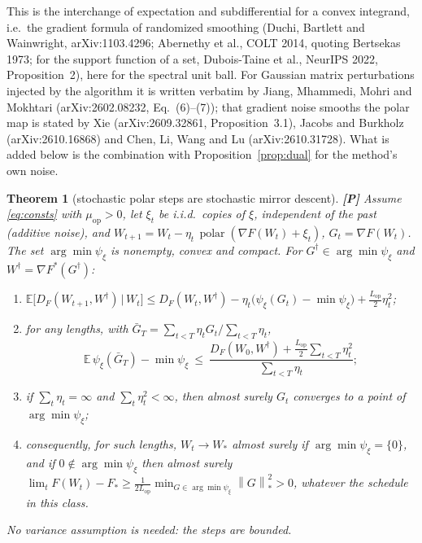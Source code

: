 \documentclass[11pt]{article}
\newtheorem{theorem}{Theorem}[section]
\theoremstyle{definition}
\theoremstyle{remark}
\newcommand{\E}{\mathbb{E}}
\newcommand{\nnuc}[1]{\left\|#1\right\|_{*}}
\newcommand{\polar}{\operatorname{polar}}
\newcommand{\Lop}{L_{\mathrm{op}}}
\newcommand{\muop}{\mu_{\mathrm{op}}}
\begin{document}
This is the interchange of expectation and subdifferential for a convex integrand, i.e.\ the gradient formula of
randomized smoothing (Duchi, Bartlett and Wainwright, arXiv:1103.4296; Abernethy et al., COLT 2014, quoting Bertsekas
1973; for the support function of a set, Dubois-Taine et al., NeurIPS 2022, Proposition~2), here for the spectral unit
ball. For Gaussian matrix perturbations injected by the algorithm it is written verbatim by Jiang, Mhammedi, Mohri and
Mokhtari (arXiv:2602.08232, Eq.~(6)--(7)); that gradient noise smooths the polar map is stated by Xie (arXiv:2609.32861,
Proposition~3.1), Jacobs and Burkholz (arXiv:2610.16868) and Chen, Li, Wang and Lu (arXiv:2610.31728). What is added below
is the combination with Proposition~\ref{prop:dual} for the method's own noise.

\begin{theorem}[stochastic polar steps are stochastic mirror descent]\label{thm:smd} \textbf{[P]}
Assume \eqref{eq:consts} with $\muop>0$, let $\xi_t$ be i.i.d.\ copies of $\xi$, independent of the past (additive
noise), and $W_{t+1}=W_t-\eta_t\,\polar(\nabla F(W_t)+\xi_t)$, $G_t=\nabla F(W_t)$. The set $\arg\min\psi_\xi$ is nonempty,
convex and compact. For $G^\dagger\in\arg\min\psi_\xi$ and $W^\dagger=\nabla F^\ast(G^\dagger)$:
\begin{enumerate}[label=(\alph*)]
\item $\displaystyle\E\big[D_F(W_{t+1},W^\dagger)\,\big|\,W_t\big]\le D_F(W_t,W^\dagger)-\eta_t\big(\psi_\xi(G_t)-\min\psi_\xi\big)+\frac{\Lop}2\eta_t^2$;
\item for any lengths, with $\bar G_T=\sum_{t<T}\eta_tG_t/\sum_{t<T}\eta_t$,
\[
\E\,\psi_\xi(\bar G_T)-\min\psi_\xi\ \le\ \frac{D_F(W_0,W^\dagger)+\frac{\Lop}2\sum_{t<T}\eta_t^2}{\sum_{t<T}\eta_t};
\]
\item if $\sum_t\eta_t=\infty$ and $\sum_t\eta_t^2<\infty$, then almost surely $G_t$ converges to a point of
$\arg\min\psi_\xi$;
\item consequently, for such lengths, $W_t\to W_\ast$ almost surely if $\arg\min\psi_\xi=\{0\}$, and if
$0\notin\arg\min\psi_\xi$ then almost surely
$\lim_t F(W_t)-F_\ast\ge\frac1{2\Lop}\min_{G\in\arg\min\psi_\xi}\nnuc G^2>0$, \emph{whatever the schedule in this
class}.
\end{enumerate}
No variance assumption is needed: the steps are bounded.
\end{theorem}
\end{document}
